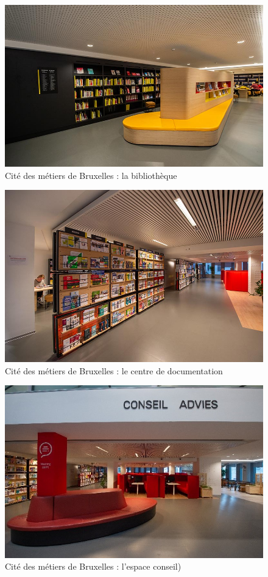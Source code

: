 \documentclass[french,a4paper,12pt]{article}
\begin{document}
\begin{figure}
\caption{Cité des métiers de Bruxelles : la bibliothèque}
\includegraphics[scale=1]{2-cdm-bibliotheque.JPG}
\end{figure}
\begin{figure}
\caption{Cité des métiers de Bruxelles : le centre de documentation}
\includegraphics[scale=1]{3-cdm-centre_de_documentation.JPG}
\end{figure}
\begin{figure}
\caption{Cité des métiers de Bruxelles : l'espace conseil)}
\includegraphics[scale=0.9]{4-cdm-espace_conseil.JPG}
\end{figure}
\end{document}
